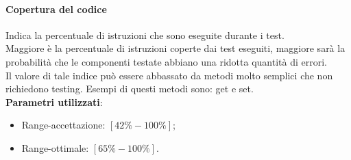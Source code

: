 \paragraph{Copertura del codice}
Indica la percentuale di istruzioni che sono eseguite durante i test.\\
Maggiore è la percentuale di istruzioni coperte dai test eseguiti, maggiore sarà la probabilità che le componenti testate abbiano una ridotta quantità di errori.\\
Il valore di tale indice può essere abbassato da metodi molto semplici che non richiedono testing. Esempi di questi metodi sono: get e set.\\
\textbf{Parametri utilizzati}:
\begin{itemize}
\item Range-accettazione: $[42\%-100\%]$;
\item Range-ottimale: $[65\%-100\%]$.
\end{itemize}
